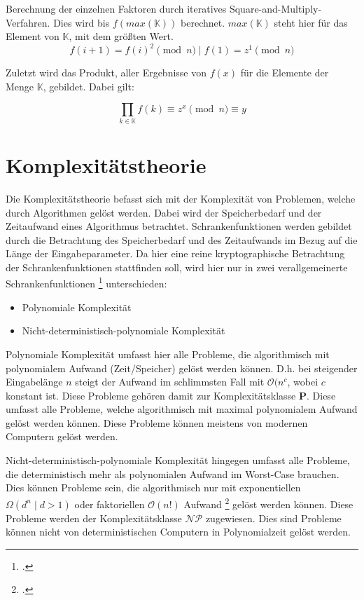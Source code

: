             Berechnung der einzelnen Faktoren durch iteratives Square-and-Multiply-Verfahren. Dies wird bis $f(max(\mathbb{K}))$ berechnet. $max(\mathbb{K})$ steht hier für das Element von $\mathbb{K}$, mit dem größten Wert.
            \begin{equation}
                f(i+1) = f(i)^{2} \pmod n \mid f(1) = z^{1} \pmod n 
            \end{equation}

            Zuletzt wird das Produkt, aller Ergebnisse von $f(x)$ für die Elemente der Menge $\mathbb{K}$, gebildet. Dabei gilt:

            \begin{equation}
                \prod_{k \in \mathbb{K}} f(k) \equiv z^{x} \pmod n \equiv y
            \end{equation}

    

\section{Komplexitätstheorie}
    Die Komplexitätstheorie befasst sich mit der Komplexität von Problemen, welche durch Algorithmen gelöst werden. Dabei wird der Speicherbedarf und der Zeitaufwand eines Algorithmus betrachtet. Schrankenfunktionen werden gebildet durch die Betrachtung des Speicherbedarf und des Zeitaufwands im Bezug auf die Länge der Eingabeparameter. Da hier eine reine kryptographische Betrachtung der Schrankenfunktionen stattfinden soll, wird hier nur in zwei verallgemeinerte Schrankenfunktionen \footcite[178]{BSW.2015} unterschieden:
    \begin{itemize}
        \item Polynomiale Komplexität
        \item Nicht-deterministisch-polynomiale Komplexität
    \end{itemize}
    Polynomiale Komplexität umfasst hier alle Probleme, die algorithmisch mit polynomialem Aufwand (Zeit/Speicher) gelöst werden können. D.h. bei steigender Eingabelänge $n$ steigt der Aufwand im schlimmsten Fall mit $\mathcal{O}(n^{c}$, wobei $c$ konstant ist.
    Diese Probleme gehören damit zur Komplexitätsklasse \textbf{P}. Diese umfasst alle Probleme, welche algorithmisch mit maximal polynomialem Aufwand gelöst werden können. Diese Probleme können meistens von modernen Computern gelöst werden.

    Nicht-deterministisch-polynomiale Komplexität hingegen umfasst alle Probleme, die deterministisch mehr als polynomialen Aufwand im Worst-Case brauchen. Dies können Probleme sein, die algorithmisch nur mit exponentiellen $\Omega(d^{n} \mid d > 1)$ oder faktoriellen $\mathcal{O}(n!)$ Aufwand \footcite{wiki.komplex} gelöst werden können. 
    Diese Probleme werden der Komplexitätsklasse $\mathcal{NP}$ zugewiesen. Dies sind Probleme können nicht von deterministischen Computern in Polynomialzeit gelöst werden. 
    

